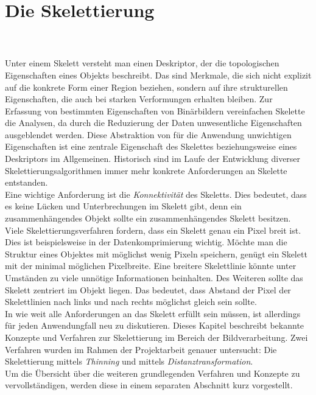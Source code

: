 \chapter{Die Skelettierung}
\label{ch:Skelettierung}
\\\\
Unter einem Skelett versteht man einen Deskriptor, der die topologischen Eigenschaften eines Objekts beschreibt. Das sind Merkmale, die sich nicht explizit auf die konkrete Form einer Region beziehen, sondern auf ihre strukturellen Eigenschaften, die auch bei starken Verformungen erhalten bleiben. Zur Erfassung von bestimmten Eigenschaften von Binärbildern vereinfachen Skelette die Analysen, da durch die Reduzierung der Daten unwesentliche Eigenschaften ausgeblendet werden. Diese Abstraktion von für die Anwendung unwichtigen Eigenschaften ist eine zentrale Eigenschaft des Skelettes beziehungsweise eines Deskriptors im Allgemeinen. 
Historisch sind im Laufe der Entwicklung diverser Skelettierungsalgorithmen 
immer mehr konkrete Anforderungen an Skelette entstanden. \\
Eine wichtige Anforderung ist die  \emph{Konnektivität} des Skeletts. Dies bedeutet, dass es keine Lücken und Unterbrechungen im Skelett gibt, denn ein zusammenhängendes Objekt sollte ein zusammenhängendes Skelett besitzen.\\
Viele Skelettierungsverfahren fordern, dass ein Skelett genau ein Pixel breit ist. Dies ist beispielsweise in der Datenkomprimierung wichtig. Möchte man die Struktur eines
Objektes mit möglichst wenig Pixeln speichern, genügt ein
Skelett mit der minimal möglichen Pixelbreite. Eine breitere
Skelettlinie könnte unter Umständen zu viele unnötige Informationen beinhalten. Des Weiteren sollte das Skelett zentriert im Objekt liegen. Das bedeutet, dass Abstand der
Pixel der Skelettlinien nach links und nach rechts 
möglichst gleich sein sollte.\\
In wie weit alle Anforderungen an das Skelett erfüllt sein müssen, ist allerdings für jeden Anwendungfall neu zu diskutieren.
Dieses Kapitel beschreibt bekannte Konzepte und Verfahren zur Skelettierung im Bereich der Bildverarbeitung.
Zwei Verfahren wurden im Rahmen der Projektarbeit genauer untersucht: Die Skelettierung mittels \emph{Thinning} und mittels \emph{Distanztransformation}. \\
Um die Übersicht über die weiteren grundlegenden Verfahren und Konzepte zu vervollständigen, werden diese in einem separaten 
Abschnitt kurz vorgestellt.
